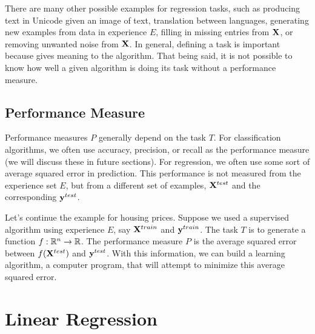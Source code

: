 There are many other possible examples for regression tasks, such as producing text in Unicode given an image of text, translation between languages, generating new examples from data in experience $E$, filling in missing entries from $\MX$, or removing unwanted noise from $\MX$. In general, defining a task is important because gives meaning to the algorithm. That being said, it is not possible to know how well a given algorithm is doing its task without a performance measure.

\subsection{Performance Measure}

Performance measures $P$ generally depend on the task $T$. For classification algorithms, we often use accuracy, precision, or recall as the performance measure (we will discuss these in future sections). For regression, we often use some sort of average squared error in prediction. This performance is not measured from the experience set $E$, but from a different set of examples, $\MX^{test}$ and the corresponding $\vy^{test}$.

\begin{example}
Let's continue the example for housing prices. Suppose we used a supervised algorithm using experience $E$, say $\MX^{train}$ and $\vy^{train}$. The task $T$ is to generate a function $f : \R^n \to \R$. The performance measure $P$ is the average squared error between $f(\MX^{test})$ and $\vy^{test}$. With this information, we can build a learning algorithm, a computer program, that will attempt to minimize this average squared error.
\end{example}

\section{Linear Regression}

